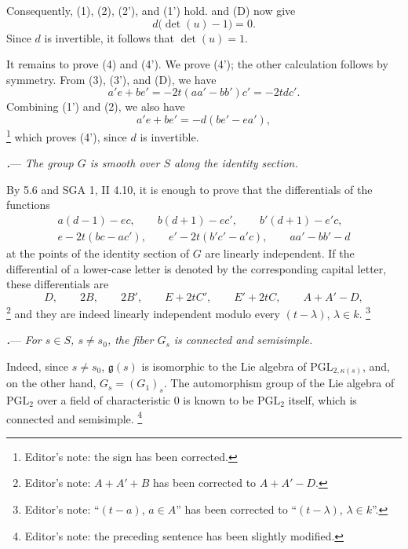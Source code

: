 Consequently, \textup{(1)}, \textup{(2)}, \textup{(2')}, and
\textup{(1')} hold.   and \textup{(D)} now give
\[
  d\bigl(\det(u)-1\bigr)=0.
\]
Since \(d\) is invertible, it follows that \(\det(u)=1\).

It remains to prove \textup{(4)} and \textup{(4')}.  We prove
\textup{(4')}; the other calculation follows by symmetry.  From
\textup{(3)}, \textup{(3')}, and \textup{(D)}, we have
\[
  a'e+be'=-2t(aa'-bb')c'=-2tdc'.
\]
Combining \textup{(1')} and \textup{(2)}, we also have
\[
  a'e+be'=-d(be'-ea'),
\]
\footnote{Editor's note: the sign has been corrected.}
which proves \textup{(4')}, since \(d\) is invertible.

\par\medskip\noindent
{}\textbf{\textit{.}}---
\textit{The group \(G\) is smooth over \(S\) along the identity
section.}



By 5.6 and SGA 1, II 4.10, it is enough to prove that the
differentials of the functions
\[
\begin{gathered}
  a(d-1)-ec,\qquad
  b(d+1)-ec',\qquad
  b'(d+1)-e'c,\\
  e-2t(bc-ac'),\qquad
  e'-2t(b'c'-a'c),\qquad
  aa'-bb'-d
\end{gathered}
\]
at the points of the identity section of \(G\) are linearly
independent.  If the differential of a lower-case letter is denoted
by the corresponding capital letter, these differentials are
\[
  D,\qquad
  2B,\qquad
  2B',\qquad
  E+2tC',\qquad
  E'+2tC,\qquad
  A+A'-D,
\]
\footnote{Editor's note: \(A+A'+B\) has been corrected to
\(A+A'-D\).}
and they are indeed linearly independent modulo every
\((t-\lambda)\), \(\lambda\in k\).
\footnote{Editor's note: ``\((t-a)\), \(a\in A\)'' has been
corrected to ``\((t-\lambda)\), \(\lambda\in k\)''.}

\par\medskip\noindent
\textbf{\textit{.}}---
\textit{For \(s\in S\), \(s\ne s_0\), the fiber \(G_s\) is connected
and semisimple.}

Indeed, since \(s\ne s_0\), \(\mathfrak g(s)\) is isomorphic to the
Lie algebra of \(\mathrm{PGL}_{2,\kappa(s)}\), and, on the other hand,
\(G_s=(G_1)_s\).  The automorphism group of the Lie algebra of
\(\mathrm{PGL}_2\) over a field of characteristic \(0\) is known to
be \(\mathrm{PGL}_2\) itself, which is connected and semisimple.
\footnote{Editor's note: the preceding sentence has been slightly
modified.}

